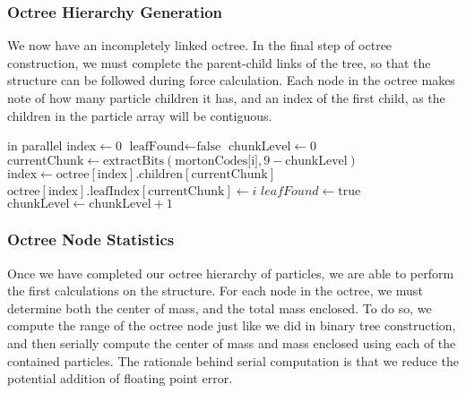\documentclass{thesis}
\begin{document}
\begin{algorithmic}
        \EndIf
    \EndFor
\end{algorithmic}

\subsubsection{Octree Hierarchy Generation}
We now have an incompletely linked octree. In the final step of octree construction, we must complete the parent-child links of the tree, so that the structure can be followed during force calculation. Each node in the octree makes note of how many particle children it has, and an index of the first child, as the children in the particle array will be contiguous. 

\begin{algorithmic}
     in parallel
        \State $\text{index} \gets 0$
        \State $\text{leafFound} \gets \text{false}$
        \State $\text{chunkLevel} \gets 0$
            \State $\text{currentChunk} \gets \text{extractBits}(\text{mortonCodes[i]}, 9 - \text{chunkLevel})$
                \State $\text{index} \gets \text{octree}[\text{index}].\text{children}[\text{currentChunk}]$
            \Else
                \State $\text{octree}[\text{index}].\text{leafIndex}[\text{currentChunk}] \gets i$
                \State $leafFound \gets \text{true}$
            \EndIf
            \State $\text{chunkLevel} \gets \text{chunkLevel} + 1$
        \EndWhile
    \EndFor
\end{algorithmic}
\subsubsection{Octree Node Statistics}
Once we have completed our octree hierarchy of particles, we are able to perform the first calculations on the structure. For each node in the octree, we must determine both the center of mass, and the total mass enclosed. To do so, we compute the range of the octree node just like we did in binary tree construction, and then serially compute the center of mass and mass enclosed using each of the contained particles. The rationale behind serial computation is that we reduce the potential addition of floating point error.
\end{document}
